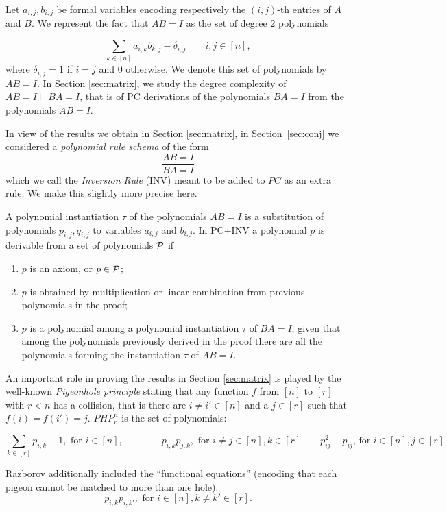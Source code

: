 \documentclass[10pt,a4paper]{article}
\theoremstyle{definition}
\begin{document}
Let $a_{i,j},b_{i,j}$ be formal variables 
 encoding respectively  the $(i,j)$-th entries of $A$ and $B$.  We represent the fact that $AB=I$ as the set of degree $2$ polynomials

$$
\sum_{k \in [n]} a_{i,k}b_{k,j} - \delta_{i,j}\qquad i,j \in [n],
$$
where $\delta_{i,j}=1$ if $i=j$ and $0$ otherwise. We denote this set of polynomials by $AB=I$. In Section \ref{sec:matrix}, we study the degree complexity of  $AB=I \vdash BA=I$, that is of PC derivations of the polynomials $BA=I$ from the polynomials $AB=I$. 

\medskip

In view of the results we obtain in Section \ref{sec:matrix}, in Section~\ref{sec:conj} we considered a  {\em polynomial rule schema} of the form 
$$
\frac{AB=I}{BA=I}
$$
which we call the {\em Inversion Rule} (INV) meant to be added to $PC$ as an extra rule. We make this slightly more precise here.

A polynomial instantiation $\tau$ of the polynomials $AB=I$ is a substitution of polynomials $p_{i,j},q_{i,j}$ to variables $a_{i,j}$ and $b_{i,j}$.   
In PC+INV a polynomial $p$ is derivable from a set of polynomials
${\cal P}$ if 
\begin{enumerate}
\item $p$ is an axiom, or $p \in {\cal P}$;
\item $p$ is obtained by multiplication or linear combination from previous polynomials in the proof;
\item $p$ is a polynomial among a polynomial instantiation $\tau$ of $BA=I$, given that among the polynomials previously derived  in the proof there are all the polynomials 
forming the instantiation $\tau$ of $AB=I$.
\end{enumerate}

\medskip

 An important role in proving the results in Section \ref{sec:matrix} is played by the well-known {\em Pigeonhole principle} stating that  any function $f$ from $[n]$ to $[r]$ with $r<n$ has a collision, that is there are $i \not= i' \in [n]$ and a $j\in[r]$ such that $f(i)=f(i')=j$. $PHP^n_r$ is the set of polynomials:

$$
\sum_{k\in [r]}p_{i,k} -1, \mbox{ for } i \in [n], \qquad \qquad p_{i,k}p_{j,k}, \mbox{ for } i \not= j \in [n], k \in [r] \qquad p_{ij}^2 - p_{ij} \text{, for $i \in [n], j \in [r]$} 
$$

Razborov \cite{DBLP:journals/cc/Razborov98} additionally included the ``functional equations'' (encoding that each pigeon cannot be matched to more than one hole):
\[
p_{i,k} p_{i,k'}, \mbox{ for } i \in [n], k \neq k' \in [r].
\]
\end{document}
